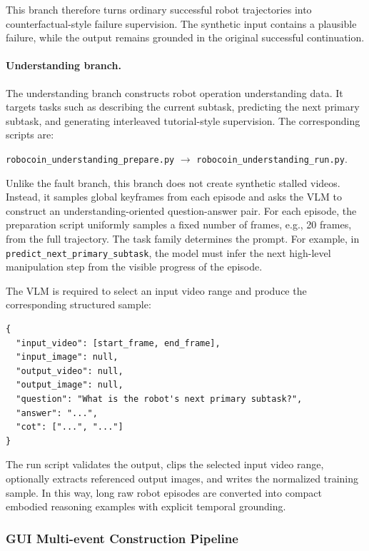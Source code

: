 This branch therefore turns ordinary successful robot trajectories into counterfactual-style failure supervision. The synthetic input contains a plausible failure, while the output remains grounded in the original successful continuation.

\paragraph{Understanding branch.}
The understanding branch constructs robot operation understanding data. It targets tasks such as describing the current subtask, predicting the next primary subtask, and generating interleaved tutorial-style supervision. The corresponding scripts are:
\begin{center}
\small
\texttt{robocoin\_understanding\_prepare.py}
$\rightarrow$
\texttt{robocoin\_understanding\_run.py}.
\end{center}

Unlike the fault branch, this branch does not create synthetic stalled videos. Instead, it samples global keyframes from each episode and asks the VLM to construct an understanding-oriented question-answer pair. For each episode, the preparation script uniformly samples a fixed number of frames, e.g., 20 frames, from the full trajectory. The task family determines the prompt. For example, in \texttt{predict\_next\_primary\_subtask}, the model must infer the next high-level manipulation step from the visible progress of the episode.

The VLM is required to select an input video range and produce the corresponding structured sample:
\begin{verbatim}
{
  "input_video": [start_frame, end_frame],
  "input_image": null,
  "output_video": null,
  "output_image": null,
  "question": "What is the robot's next primary subtask?",
  "answer": "...",
  "cot": ["...", "..."]
}
\end{verbatim}

The run script validates the output, clips the selected input video range, optionally extracts referenced output images, and writes the normalized training sample. In this way, long raw robot episodes are converted into compact embodied reasoning examples with explicit temporal grounding.

\subsubsection{GUI Multi-event Construction Pipeline}
\label{app:gui_pipeline}

